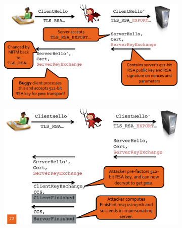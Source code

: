 \documentclass[11pt,oneside,a4paper]{article}
\begin{document}
\begin{figure}[hb]
	\centering
	\begin{subfigure}[t]{.5\textwidth}
		\centering
		\includegraphics[width=\linewidth]{figures/tls_freak_1}
		\label{fig:tls_freak_1}
	\end{subfigure}%
	\begin{subfigure}[t]{.5\textwidth}
		\centering
		\includegraphics[width=\linewidth]{figures/tls_freak_2}
		\label{fig:tls_freak_2}
	\end{subfigure}
\end{figure}
\end{document}
